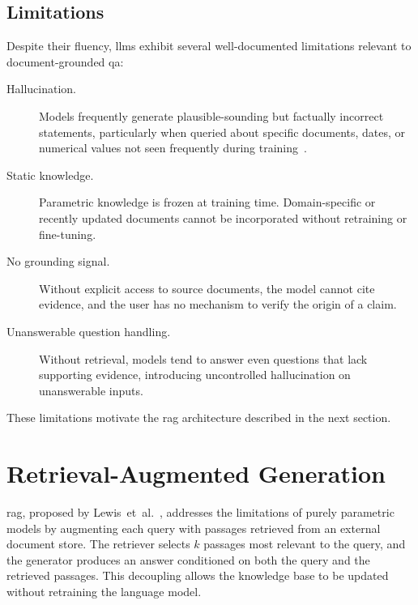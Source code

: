 \subsection{Limitations}

Despite their fluency, \glspl{llm} exhibit several well-documented
limitations relevant to document-grounded \gls{qa}:

\begin{description}
    \item[Hallucination.] Models frequently generate plausible-sounding but
        factually incorrect statements, particularly when queried about specific
        documents, dates, or numerical values not seen frequently during
        training~\cite{lewis2020rag}.

    \item[Static knowledge.] Parametric knowledge is frozen at training time.
        Domain-specific or recently updated documents cannot be incorporated
        without retraining or fine-tuning.

    \item[No grounding signal.] Without explicit access to source documents,
        the model cannot cite evidence, and the user has no mechanism to verify
        the origin of a claim.

    \item[Unanswerable question handling.] Without retrieval, models tend to
        answer even questions that lack supporting evidence, introducing
        uncontrolled hallucination on unanswerable inputs.
\end{description}

These limitations motivate the \gls{rag} architecture described in the next section.


\section{Retrieval-Augmented Generation}\label{sec:bg:rag}

\Gls{rag}, proposed by Lewis~et~al.~\cite{lewis2020rag}, addresses the limitations
of purely parametric models by augmenting each query with passages retrieved from
an external document store. The retriever selects $k$ passages most relevant to the
query, and the generator produces an answer conditioned on both the query and the
retrieved passages. This decoupling allows the knowledge base to be updated without
retraining the language model.

